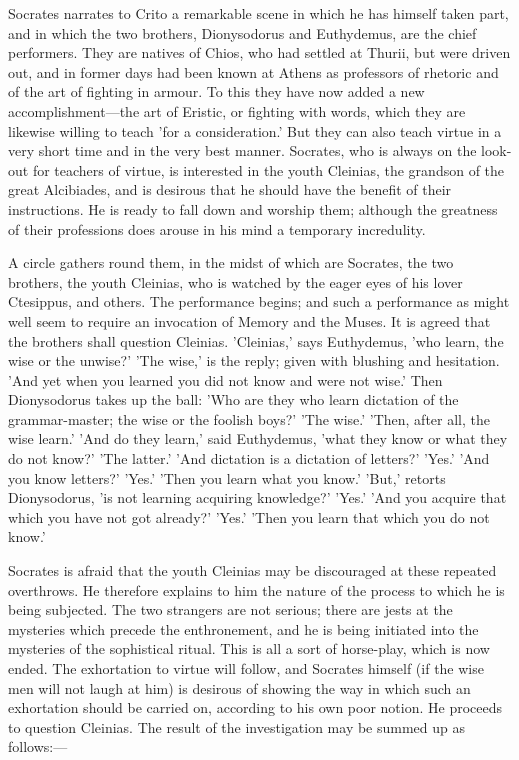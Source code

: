 \documentclass[11pt,letter]{article}
\begin{document}
\par  Socrates narrates to Crito a remarkable scene in which he has himself taken part, and in which the two brothers, Dionysodorus and Euthydemus, are the chief performers. They are natives of Chios, who had settled at Thurii, but were driven out, and in former days had been known at Athens as professors of rhetoric and of the art of fighting in armour. To this they have now added a new accomplishment—the art of Eristic, or fighting with words, which they are likewise willing to teach 'for a consideration.' But they can also teach virtue in a very short time and in the very best manner. Socrates, who is always on the look-out for teachers of virtue, is interested in the youth Cleinias, the grandson of the great Alcibiades, and is desirous that he should have the benefit of their instructions. He is ready to fall down and worship them; although the greatness of their professions does arouse in his mind a temporary incredulity.

\par  A circle gathers round them, in the midst of which are Socrates, the two brothers, the youth Cleinias, who is watched by the eager eyes of his lover Ctesippus, and others. The performance begins; and such a performance as might well seem to require an invocation of Memory and the Muses. It is agreed that the brothers shall question Cleinias. 'Cleinias,' says Euthydemus, 'who learn, the wise or the unwise?' 'The wise,' is the reply; given with blushing and hesitation. 'And yet when you learned you did not know and were not wise.' Then Dionysodorus takes up the ball: 'Who are they who learn dictation of the grammar-master; the wise or the foolish boys?' 'The wise.' 'Then, after all, the wise learn.' 'And do they learn,' said Euthydemus, 'what they know or what they do not know?' 'The latter.' 'And dictation is a dictation of letters?' 'Yes.' 'And you know letters?' 'Yes.' 'Then you learn what you know.' 'But,' retorts Dionysodorus, 'is not learning acquiring knowledge?' 'Yes.' 'And you acquire that which you have not got already?' 'Yes.' 'Then you learn that which you do not know.'

\par  Socrates is afraid that the youth Cleinias may be discouraged at these repeated overthrows. He therefore explains to him the nature of the process to which he is being subjected. The two strangers are not serious; there are jests at the mysteries which precede the enthronement, and he is being initiated into the mysteries of the sophistical ritual. This is all a sort of horse-play, which is now ended. The exhortation to virtue will follow, and Socrates himself (if the wise men will not laugh at him) is desirous of showing the way in which such an exhortation should be carried on, according to his own poor notion. He proceeds to question Cleinias. The result of the investigation may be summed up as follows:—
\end{document}
